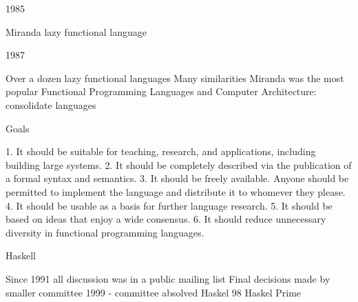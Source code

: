 
\begin{frame}
1985

Miranda
lazy functional language
\end{frame}

\begin{frame}
1987

Over a dozen lazy functional languages  
Many similarities
Miranda was the most popular
Functional Programming Languages and Computer Architecture: consolidate languages
\end{frame}

\begin{frame}
Goals

1. It should be suitable for teaching, research, and applications,
including building large systems.
2. It should be completely described via the publication of a formal
syntax and semantics.
3. It should be freely available. Anyone should be permitted to
implement the language and distribute it to whomever they
please.
4. It should be usable as a basis for further language research.
5. It should be based on ideas that enjoy a wide consensus.
6. It should reduce unnecessary diversity in functional programming
languages.

\end{frame}

\begin{frame}
Haskell

Since 1991 all discussion was in a public mailing list
Final decisions made by smaller committee
1999 - committee absolved
Haskel 98
Haskel Prime
\end{frame}
